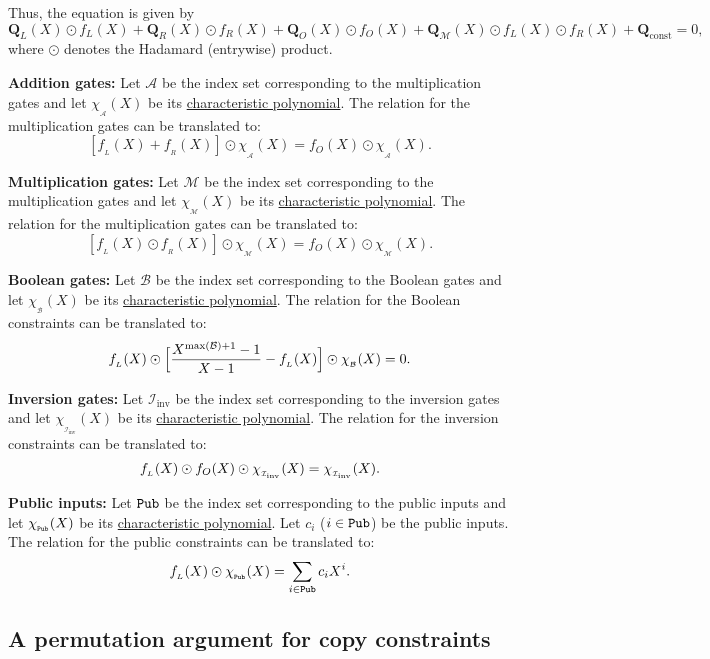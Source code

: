 \documentclass[11pt, lettersize, notitlepage, leqno, footskip=0.6cm]{article}
\newcommand{\mc}{\mathcal}
\newcommand{\mbf}{\mathbf}
\newcommand{\mr}{\mathrm}
\newcommand{\vs}{\vspace{-0.15cm}}
\newcommand{\noin}{\noindent}
\numberwithin{equation}{section}
\begin{document}
\noin Thus, the equation is given by $$ \mbf{Q}_{L}(X)\odot f_{L}(X) + \mbf{Q}_{R}(X)\odot f_{R}(X) + \mbf{Q}_{O}(X)\odot f_{O}(X) + \mbf{Q}_{\mc{M}}(X)\odot f_{L}(X)\odot f_{R}(X) +  \mbf{Q}_{\mr{const}} = 0,$$ where $\odot$ denotes the Hadamard (entrywise) product.

\bigskip






\noin \textbf{Addition gates:} Let $\mc{A}$ be the index set corresponding to the multiplication gates and let $\chi_{_{\mc{A}}}(X)$ be its \hyperlink{charpoly}{characteristic polynomial}. The relation for the multiplication gates can be translated to: \vs $$ [f_{_L}(X)+ f_{_R}(X)] \odot \chi_{_{\mc{A}}}(X)   =  f_{O}(X) \odot \chi_{_{\mc{A}}}(X).  $$ 

\noin \textbf{Multiplication gates:} Let $\mc{M}$ be the index set corresponding to the multiplication gates and let $\chi_{_{\mc{M}}}(X)$ be its \hyperlink{charpoly}{characteristic polynomial}. The relation for the multiplication gates can be translated to: \vs $$ [f_{_L}(X)\odot f_{_R}(X)] \odot \chi_{_{\mc{M}}}(X)   =  f_{O}(X) \odot \chi_{_{\mc{M}}}(X).$$ 

\noin \textbf{Boolean gates:} Let $\mc{B}$ be the index set corresponding to the Boolean gates and let $\chi_{_{\mc{B}}}(X)$ be its \hyperlink{charpoly}{characteristic polynomial}. The relation for the Boolean constraints can be translated to: \vs $$ f_{_L}(X)\odot \Big[ \frac{X^{\max(\mc{B})+1}-1}{X-1} - f_{_L}(X) \Big] \odot  \chi_{_{\mc{B}}}(X) = 0 . \vs $$


\noin \textbf{Inversion gates:} Let $\mc{I}_{\mr{inv}}$ be the index set corresponding to the inversion gates and let $\chi_{_{\mc{I}_{\mr{inv}}}}(X)$ be its \hyperlink{charpoly}{characteristic polynomial}. The relation for the inversion constraints can be translated to: \vs $$ f_{_L}(X)\odot f_{O}(X) \odot  \chi_{_{\mc{\mc{I}_{\mr{inv}}}}}(X) =  \chi_{_{\mc{\mc{I}_{\mr{inv}}}}}(X). \vs $$


\noin \textbf{Public inputs:} Let $\tt{Pub}$ be the index set corresponding to the public inputs and let $\chi_{_{\tt{Pub}}}(X)$ be its \hyperlink{charpoly}{characteristic polynomial}. Let $c_i$ ($i\in \tt{Pub}$) be the public inputs. The relation for the public constraints can be translated to: \vs $$ f_{_L}(X)\odot \chi_{_{\tt{Pub}}}(X) = \sum\limits_{i\in \tt{Pub}} c_iX^i .$$




\subsection{\fontsize{11}{11}\selectfont A permutation argument for copy constraints}
\end{document}
